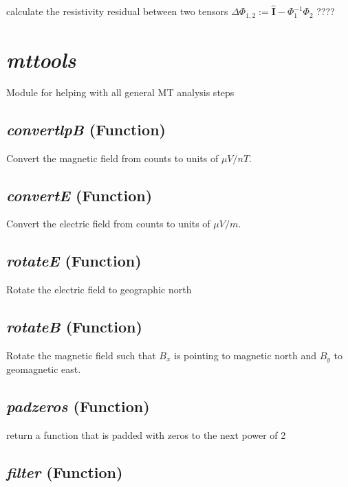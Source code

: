 calculate the resistivity residual between two tensors
    $ \Delta \Phi_{1,2} := \hat{\mathbf{I}} - \Phi_1^{-1} \Phi_2$
    ????



\section{\textit{mttools} }
\label{sec:core.mttools}

Module for helping with all general MT analysis steps


\subsection{\textit{convertlpB} (Function)}
\label{ssec:core.mttools.convertlpB}

Convert the magnetic field from counts to units of $\mu V/nT$.

\subsection{\textit{convertE} (Function)}
\label{ssec:core.mttools.convertE}

Convert the electric field from counts to units of $\mu V/m$.

\subsection{\textit{rotateE} (Function)}
\label{ssec:core.mttools.rotateE}

Rotate the electric field to geographic north

\subsection{\textit{rotateB} (Function)}
\label{ssec:core.mttools.rotateB}

Rotate the magnetic field such that $B_x$ is pointing to
    magnetic north and $B_y$ to geomagnetic east.

\subsection{\textit{padzeros} (Function)}
\label{ssec:core.mttools.padzeros}

return a function that is padded with zeros to the next power of 2

\subsection{\textit{filter} (Function)}
\label{ssec:core.mttools.filter}

